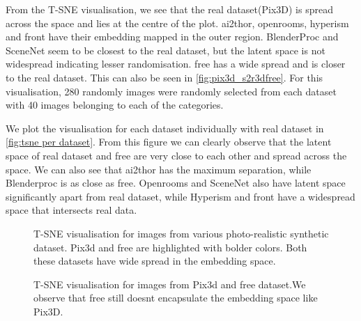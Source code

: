 From the T-SNE visualisation, we see that the real dataset(Pix3D) is spread across the space and lies at the centre of the plot.
\gls{ai2thor}, openrooms, hyperism and \gls{front} have their embedding mapped in the outer region.
BlenderProc and SceneNet seem to be closest to the real dataset, but the latent space is not widespread indicating lesser randomisation.
\gls{free} has a wide spread and is closer to the real dataset.
This can also be seen in \autoref{fig:pix3d_s2r3dfree}.
For this visualisation, 280 randomly images were randomly selected from each dataset with 40 images belonging to each of the categories.

We plot the visualisation for each dataset individually with real dataset in \autoref{fig:tsne per dataset}.
From this figure we can clearly observe that the latent space of real dataset and \gls{free} are very close to each other and spread across the space.
We can also see that \gls{ai2thor} has the maximum separation, while Blenderproc is as close as \gls{free}.
Openrooms and SceneNet also have latent space significantly apart from real dataset, while Hyperism and \gls{front} have a widespread space that intersects real data.

\begin{figure}
    \centering
    \resizebox{\textwidth}{10cm}{}
    \caption{T-SNE visualisation for images from various photo-realistic synthetic dataset. Pix3d and \gls{free} are highlighted with bolder colors.
    Both these datasets have wide spread in the embedding space.}
    \label{fig:photorealistic tsne}
\end{figure}

\begin{figure}
    \centering
    \resizebox{\textwidth}{10cm}{}
    \caption{T-SNE visualisation for images from Pix3d and \gls{free} dataset.We observe that \gls{free} still doesnt encapsulate the embedding space like Pix3D.}
    \label{fig:pix3d_s2r3dfree}
\end{figure}

